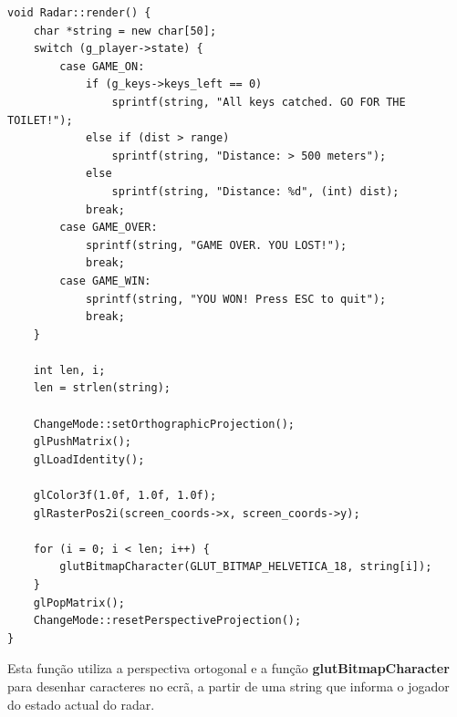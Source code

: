 \begin{lstlisting}[caption=Render do Radar]
void Radar::render() {
	char *string = new char[50];
	switch (g_player->state) {
		case GAME_ON:
			if (g_keys->keys_left == 0)
				sprintf(string, "All keys catched. GO FOR THE TOILET!");
			else if (dist > range)
				sprintf(string, "Distance: > 500 meters");
			else
				sprintf(string, "Distance: %d", (int) dist);
			break;
		case GAME_OVER:
			sprintf(string, "GAME OVER. YOU LOST!");
			break;
		case GAME_WIN:
			sprintf(string, "YOU WON! Press ESC to quit");
			break;
	}

	int len, i;
	len = strlen(string);
	
	ChangeMode::setOrthographicProjection();
	glPushMatrix();
	glLoadIdentity();

	glColor3f(1.0f, 1.0f, 1.0f);
	glRasterPos2i(screen_coords->x, screen_coords->y);
	
	for (i = 0; i < len; i++) {
		glutBitmapCharacter(GLUT_BITMAP_HELVETICA_18, string[i]);
	}
	glPopMatrix();
	ChangeMode::resetPerspectiveProjection();
}
\end{lstlisting}

Esta função utiliza a perspectiva ortogonal e a função \textbf{glutBitmapCharacter} para desenhar caracteres no ecrã, a partir de uma string que informa o jogador do estado actual do radar.
